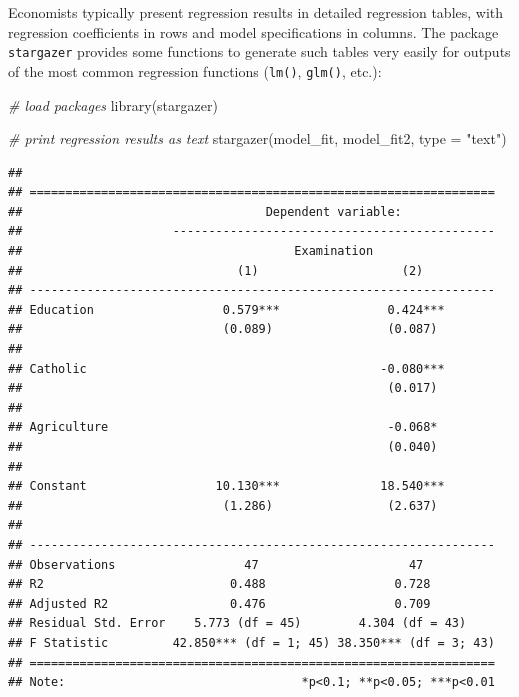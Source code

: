 \documentclass[
  12pt,
]{style/krantz}
\newenvironment{Shaded}{\begin{snugshade}}{\end{snugshade}}
\newcommand{\AttributeTok}[1]{\textcolor[rgb]{0.77,0.63,0.00}{#1}}
\newcommand{\CommentTok}[1]{\textcolor[rgb]{0.56,0.35,0.01}{\textit{#1}}}
\newcommand{\FunctionTok}[1]{\textcolor[rgb]{0.00,0.00,0.00}{#1}}
\newcommand{\NormalTok}[1]{#1}
\newcommand{\StringTok}[1]{\textcolor[rgb]{0.31,0.60,0.02}{#1}}
\begin{document}
Economists typically present regression results in detailed regression tables, with regression coefficients in rows and model specifications in columns. The package \texttt{stargazer} provides some functions to generate such tables very easily for outputs of the most common regression functions (\texttt{lm()}, \texttt{glm()}, etc.):

\begin{Shaded}
\begin{Highlighting}[]
\CommentTok{\# load packages}
\FunctionTok{library}\NormalTok{(stargazer)}
\end{Highlighting}
\end{Shaded}

\begin{Shaded}
\begin{Highlighting}[]
\CommentTok{\# print regression results as text}
\FunctionTok{stargazer}\NormalTok{(model\_fit, model\_fit2, }\AttributeTok{type =} \StringTok{"text"}\NormalTok{)}
\end{Highlighting}
\end{Shaded}

\begin{verbatim}
## 
## =================================================================
##                                  Dependent variable:             
##                     ---------------------------------------------
##                                      Examination                 
##                              (1)                    (2)          
## -----------------------------------------------------------------
## Education                  0.579***               0.424***       
##                            (0.089)                (0.087)        
##                                                                  
## Catholic                                         -0.080***       
##                                                   (0.017)        
##                                                                  
## Agriculture                                       -0.068*        
##                                                   (0.040)        
##                                                                  
## Constant                  10.130***              18.540***       
##                            (1.286)                (2.637)        
##                                                                  
## -----------------------------------------------------------------
## Observations                  47                     47          
## R2                          0.488                  0.728         
## Adjusted R2                 0.476                  0.709         
## Residual Std. Error    5.773 (df = 45)        4.304 (df = 43)    
## F Statistic         42.850*** (df = 1; 45) 38.350*** (df = 3; 43)
## =================================================================
## Note:                                 *p<0.1; **p<0.05; ***p<0.01
\end{verbatim}
\end{document}
